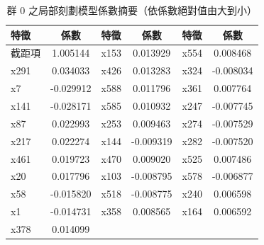 \documentclass[12pt,a4paper,oneside]{book}
\begin{document}
	\begin{table}[H]
		\centering
		\caption{群 0 之局部刻劃模型係數摘要（依係數絕對值由大到小）}
		\vspace{0.15cm}
		\label{tab:群0係數}
		\renewcommand{\arraystretch}{1}
		\setlength{\tabcolsep}{8pt}
		\begin{tabular}{lc|lc|lc}
			\hline
			特徵 & 係數 & 特徵 & 係數 & 特徵 & 係數 \\
			\hline
			截距項       & 1.005144  & x153 & 0.013929  & x554 & 0.008468  \\
			x291        & 0.034033  & x426 & 0.013283  & x324 & -0.008034 \\
			x7          & -0.029912 & x588 & 0.011796  & x361 & 0.007764  \\
			x141        & -0.028171 & x585 & 0.010932  & x247 & -0.007745 \\
			x87         & 0.022993  & x253 & 0.009463  & x274 & -0.007529 \\
			x217        & 0.022274  & x144 & -0.009319 & x282 & -0.007520 \\
			x461        & 0.019723  & x470 & 0.009020  & x525 & 0.007486  \\
			x20         & 0.017796  & x103 & -0.008795 & x578 & -0.006877 \\
			x58         & -0.015820 & x518 & -0.008775 & x240 & 0.006598  \\
			x1          & -0.014731 & x358 & 0.008565  & x164 & 0.006592  \\
			x378        & 0.014099  &      &           &      &           \\
			\hline
		\end{tabular}
	\end{table}
\end{document}
